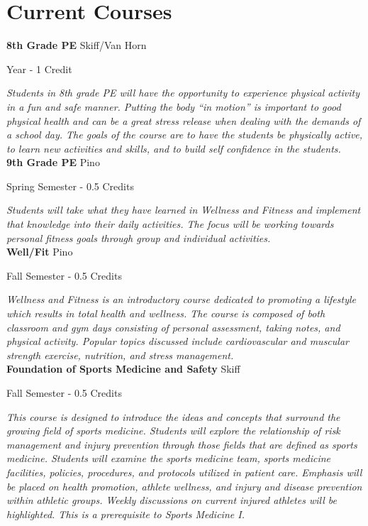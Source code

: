 \section{Current Courses}

\noindent\textbf{8th Grade PE} \hfill Skiff/Van Horn

\noindent Year - 1 Credit

\vspace{1mm}\emph{Students in 8th grade PE will have the opportunity to experience physical activity in a fun and safe manner.  Putting the body “in motion” is important to good physical health and can be a great stress release when dealing with the demands of a school day.  The goals of the course are to have the students be physically active, to learn new activities and skills, and to build self confidence in the students.}\\


\noindent\textbf{9th Grade PE} \hfill Pino

\noindent Spring Semester - 0.5 Credits

\vspace{1mm}\emph{Students will take what they have learned in Wellness and Fitness and implement that knowledge into their daily activities.  The focus will be working towards personal fitness goals through group and individual activities.}\\


\noindent\textbf{Well/Fit} \hfill Pino

\noindent Fall Semester - 0.5 Credits

\vspace{1mm}\emph{Wellness and Fitness is an introductory course dedicated to promoting a lifestyle which results in total health and wellness. The course is composed of both classroom and gym days consisting of personal assessment, taking notes, and physical activity.  Popular topics discussed include cardiovascular and muscular strength exercise, nutrition, and stress management.}\\


\noindent\textbf{Foundation of Sports Medicine and Safety} \hfill Skiff

\noindent Fall Semester - 0.5 Credits

\vspace{1mm}\emph{This course is designed to introduce the ideas and concepts that surround the growing field of sports medicine.  Students will explore the relationship of risk management and injury prevention through those fields that are defined as sports medicine. Students will examine the sports medicine team, sports medicine facilities, policies, procedures, and protocols utilized in patient care. Emphasis will be placed on health promotion, athlete wellness, and injury and disease prevention within athletic groups. Weekly discussions on current injured athletes will be highlighted.  This is a prerequisite to Sports Medicine I.}\\


